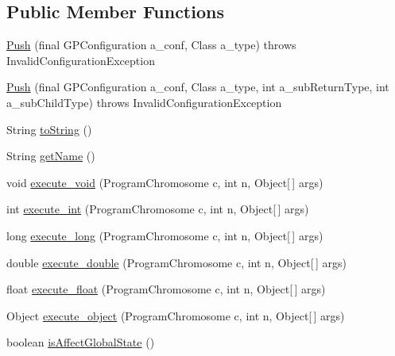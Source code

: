 \subsection*{Public Member Functions}
\begin{DoxyCompactItemize}
\item 
\hyperlink{classorg_1_1jgap_1_1gp_1_1function_1_1_push_a51eccd24dedd5154162a0be7a925175e}{Push} (final G\-P\-Configuration a\-\_\-conf, Class a\-\_\-type)  throws Invalid\-Configuration\-Exception 
\item 
\hyperlink{classorg_1_1jgap_1_1gp_1_1function_1_1_push_a47e148c3c7221d297653a063ab9d25a9}{Push} (final G\-P\-Configuration a\-\_\-conf, Class a\-\_\-type, int a\-\_\-sub\-Return\-Type, int a\-\_\-sub\-Child\-Type)  throws Invalid\-Configuration\-Exception 
\item 
String \hyperlink{classorg_1_1jgap_1_1gp_1_1function_1_1_push_a7fa730f36416714293a660b1ed1f600e}{to\-String} ()
\item 
String \hyperlink{classorg_1_1jgap_1_1gp_1_1function_1_1_push_a44442c6f105598d741fd1f8ed43ac877}{get\-Name} ()
\item 
void \hyperlink{classorg_1_1jgap_1_1gp_1_1function_1_1_push_ad9d034ab503d55b144f69e2c473b69a6}{execute\-\_\-void} (Program\-Chromosome c, int n, Object\mbox{[}$\,$\mbox{]} args)
\item 
int \hyperlink{classorg_1_1jgap_1_1gp_1_1function_1_1_push_a15ddb37620d5206fceff8436b588931c}{execute\-\_\-int} (Program\-Chromosome c, int n, Object\mbox{[}$\,$\mbox{]} args)
\item 
long \hyperlink{classorg_1_1jgap_1_1gp_1_1function_1_1_push_adfacbc9b36917e4f26d51c4878d5a172}{execute\-\_\-long} (Program\-Chromosome c, int n, Object\mbox{[}$\,$\mbox{]} args)
\item 
double \hyperlink{classorg_1_1jgap_1_1gp_1_1function_1_1_push_af6787900493232960842ca03f20a158f}{execute\-\_\-double} (Program\-Chromosome c, int n, Object\mbox{[}$\,$\mbox{]} args)
\item 
float \hyperlink{classorg_1_1jgap_1_1gp_1_1function_1_1_push_a941e3950f09284780a9db5b7494f12bb}{execute\-\_\-float} (Program\-Chromosome c, int n, Object\mbox{[}$\,$\mbox{]} args)
\item 
Object \hyperlink{classorg_1_1jgap_1_1gp_1_1function_1_1_push_a8f0202eb5d4aca485c5509fe9498930f}{execute\-\_\-object} (Program\-Chromosome c, int n, Object\mbox{[}$\,$\mbox{]} args)
\item 
boolean \hyperlink{classorg_1_1jgap_1_1gp_1_1function_1_1_push_a44b325b83a314c139630027e8664eb98}{is\-Affect\-Global\-State} ()

\end{DoxyCompactItemize}
